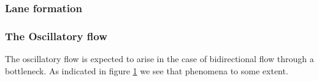 \subsubsection{Lane formation}

\subsubsection{The Oscillatory flow}
The oscillatory flow is expected to arise in the case of bidirectional 
flow through a bottleneck. As indicated in figure \ref{fig:oscillitoryflow} 
we see that phenomena to some extent.

\begin{figure}[h]
\centering
{}
\caption{}
\label{fig:oscillitoryflow}
\end{figure}


